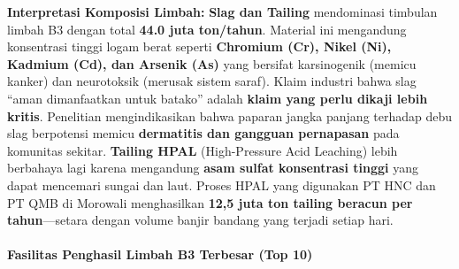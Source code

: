 \documentclass[
]{article}
\begin{document}
\textbf{Interpretasi Komposisi Limbah:} \textbf{Slag dan Tailing}
mendominasi timbulan limbah B3 dengan total \textbf{44.0 juta
ton/tahun}. Material ini mengandung konsentrasi tinggi logam berat
seperti \textbf{Chromium (Cr), Nikel (Ni), Kadmium (Cd), dan Arsenik
(As)} yang bersifat karsinogenik (memicu kanker) dan neurotoksik
(merusak sistem saraf). Klaim industri bahwa slag ``aman dimanfaatkan
untuk batako'' adalah \textbf{klaim yang perlu dikaji lebih kritis}.
Penelitian mengindikasikan bahwa paparan jangka panjang terhadap debu
slag berpotensi memicu \textbf{dermatitis dan gangguan pernapasan} pada
komunitas sekitar. \textbf{Tailing HPAL} (High-Pressure Acid Leaching)
lebih berbahaya lagi karena mengandung \textbf{asam sulfat konsentrasi
tinggi} yang dapat mencemari sungai dan laut. Proses HPAL yang digunakan
PT HNC dan PT QMB di Morowali menghasilkan \textbf{12,5 juta ton tailing
beracun per tahun}---setara dengan volume banjir bandang yang terjadi
setiap hari.

\paragraph{Fasilitas Penghasil Limbah B3 Terbesar (Top
10)}\label{fasilitas-penghasil-limbah-b3-terbesar-top-10}
\end{document}
